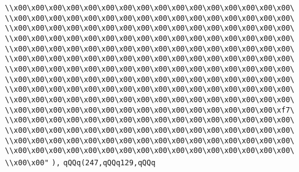 \verb|\\x00\x00\x00\x00\x00\x00\x00\x00\x00\x00\x00\x00\x00\x00\x00\x00\|\newline
\verb|\\x00\x00\x00\x00\x00\x00\x00\x00\x00\x00\x00\x00\x00\x00\x00\x00\|\newline
\verb|\\x00\x00\x00\x00\x00\x00\x00\x00\x00\x00\x00\x00\x00\x00\x00\x00\|\newline
\verb|\\x00\x00\x00\x00\x00\x00\x00\x00\x00\x00\x00\x00\x00\x00\x00\x00\|\newline
\verb|\\x00\x00\x00\x00\x00\x00\x00\x00\x00\x00\x00\x00\x00\x00\x00\x00\|\newline
\verb|\\x00\x00\x00\x00\x00\x00\x00\x00\x00\x00\x00\x00\x00\x00\x00\x00\|\newline
\verb|\\x00\x00\x00\x00\x00\x00\x00\x00\x00\x00\x00\x00\x00\x00\x00\x00\|\newline
\verb|\\x00\x00\x00\x00\x00\x00\x00\x00\x00\x00\x00\x00\x00\x00\x00\x00\|\newline
\verb|\\x00\x00\x00\x00\x00\x00\x00\x00\x00\x00\x00\x00\x00\x00\x00\x00\|\newline
\verb|\\x00\x00\x00\x00\x00\x00\x00\x00\x00\x00\x00\x00\x00\x00\x00\x00\|\newline
\verb|\\x00\x00\x00\x00\x00\x00\x00\x00\x00\x00\x00\x00\x00\x00\x00\xf7\|\newline
\verb|\\x00\x00\x00\x00\x00\x00\x00\x00\x00\x00\x00\x00\x00\x00\x00\x00\|\newline
\verb|\\x00\x00\x00\x00\x00\x00\x00\x00\x00\x00\x00\x00\x00\x00\x00\x00\|\newline
\verb|\\x00\x00\x00\x00\x00\x00\x00\x00\x00\x00\x00\x00\x00\x00\x00\x00\|\newline
\verb|\\x00\x00\x00\x00\x00\x00\x00\x00\x00\x00\x00\x00\x00\x00\x00\x00\|\newline
\verb|\\x00\x00"|\newline
\verb|),|\newline
\verb|qQQq(247,qQQq129,qQQq|\newline
